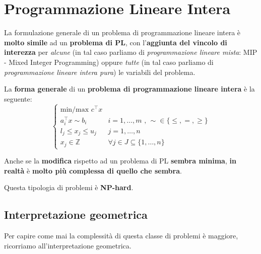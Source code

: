 
\chapter{Programmazione Lineare Intera}

La formulazione generale di un problema di programmazione lineare intera è
\textbf{molto simile} ad un \textbf{problema di PL}, con l'\textbf{aggiunta del
vincolo di interezza} per \textit{alcune} (in tal caso parliamo di 
\textit{programmazione lineare mista}: MIP - Mixed Integer Programming) oppure
\textit{tutte} (in tal caso parliamo di \textit{programmazione lineare intera pura}) 
le variabili del problema.

\begin{definition}
    La \textbf{forma generale} di un \textbf{problema di programmazione
    lineare intera} è la seguente:
    \[
        \begin{cases}
            \text{min/max } c^\top x \\ 
            a_i^\top x \sim b_i & i = 1,\ldots ,m \text{ , }\sim \in \{\le , =, \ge \} \\
            l_j \le x_j \le u_j & j = 1,\ldots ,n \\ 
            x_j \in \mathbb{Z} & \forall j\in J \subseteq \{1,\ldots ,n\}  
        \end{cases}
    \] 
\end{definition}

Anche se la \textbf{modifica} rispetto ad un problema di PL \textbf{sembra minima},
\textbf{in realtà} è \textbf{molto più complessa di quello che sembra}.

\begin{remark}
    Questa tipologia di problemi è \textbf{NP-hard}.
\end{remark}

\section{Interpretazione geometrica}

Per capire come mai la complessità di questa classe di problemi è maggiore,
ricorriamo all'interpretazione geometrica.

